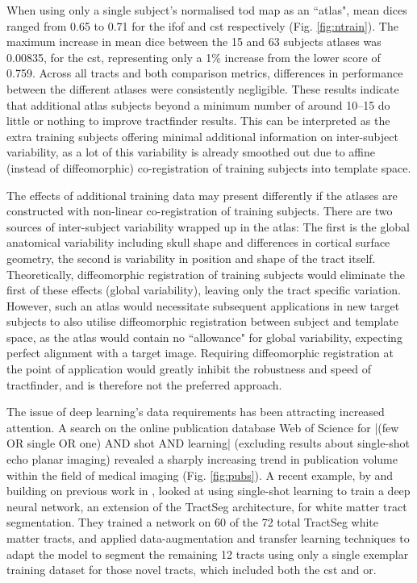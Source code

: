 When using only a single subject's normalised \gls{tod} map as an ``atlas", mean \glspl{dice} ranged from 0.65 to 0.71 for the \gls{ifof} and \gls{cst} respectively (Fig. \ref{fig:ntrain}).
The maximum increase in mean \gls{dice} between the 15 and 63 subjects atlases was 0.00835, for the \gls{cst}, representing only a 1\% increase from the lower score of 0.759.
Across all tracts and both comparison metrics, differences in performance between the different atlases were consistently negligible.
These results indicate that additional atlas subjects beyond a minimum number of around 10--15 do little or nothing to improve tractfinder results.
This can be interpreted as the extra training subjects offering minimal additional information on inter-subject variability, as a lot of this variability is already smoothed out due to affine (instead of diffeomorphic) co-registration of training subjects into template space.

The effects of additional training data may present differently if the atlases are constructed with non-linear co-registration of training subjects. %
There are two sources of inter-subject variability wrapped up in the atlas:
The first is the global anatomical variability including skull shape and differences in cortical surface geometry, the second is variability in position and shape of the tract itself.
Theoretically, diffeomorphic registration of training subjects would eliminate the first of these effects (global variability), leaving only the tract specific variation.
However, such an atlas would necessitate subsequent applications in new target subjects to also utilise diffeomorphic registration between subject and template space, as the atlas would contain no ``allowance" for global variability, expecting perfect alignment with a target image.
Requiring diffeomorphic registration at the point of application would greatly inhibit the robustness and speed of tractfinder, and is therefore not the preferred approach.

The issue of deep learning's data requirements has been attracting increased attention.
A search on the online publication database Web of Science for \spverb|(few OR single OR one) AND shot AND learning|  (excluding results about single-shot echo planar imaging) revealed a sharply increasing trend in publication volume within the field of medical imaging (Fig. \ref{fig:pubs}).
A recent example, by \textcite{Liu2023a} and building on previous work in \textcite{Lu2021}, looked at using single-shot learning to train a deep neural network, an extension of the TractSeg architecture, for white matter tract segmentation.
They trained a network on 60 of the 72 total TractSeg white matter tracts, and applied data-augmentation and transfer learning techniques to adapt the model to segment the remaining 12 tracts using only a single exemplar training dataset for those novel tracts, which included both the \gls{cst} and \gls{or}.

